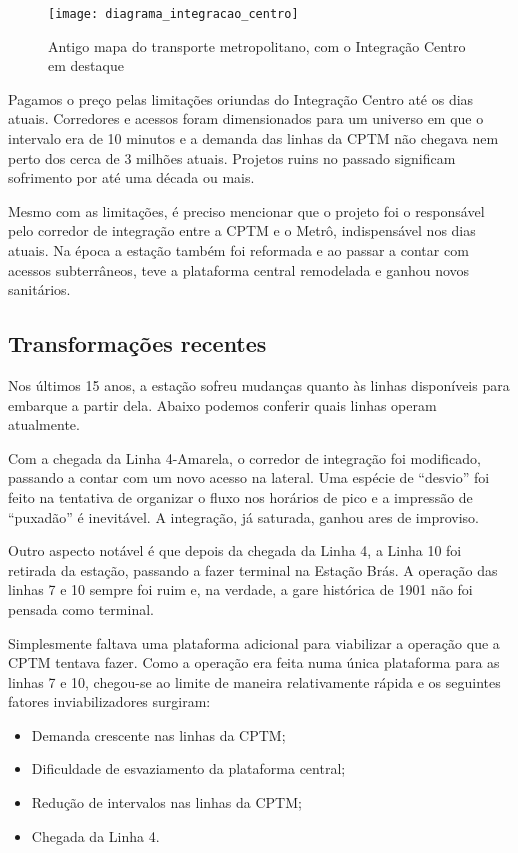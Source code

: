 \documentclass[11pt,fleqn]{book} %
\begin{document}
\begin{figure}[htb]
	\centering
	\texttt{[image: diagrama\_integracao\_centro]}
	\caption[Mapa do Integração Centro]{Antigo mapa do transporte metropolitano, com o Integração Centro em destaque}
	\label{fig:diag_ic}
\end{figure}

Pagamos o preço pelas limitações oriundas do Integração Centro até os dias atuais. Corredores e acessos foram dimensionados para um universo em que o intervalo era de 10 minutos e a demanda das linhas da CPTM não chegava nem perto dos cerca de 3 milhões atuais. Projetos ruins no passado significam sofrimento por até uma década ou mais.

Mesmo com as limitações, é preciso mencionar que o projeto foi o responsável pelo corredor de integração entre a CPTM e o Metrô, indispensável nos dias atuais. Na época a estação também foi reformada e ao passar a contar com acessos subterrâneos, teve a plataforma central remodelada e ganhou novos sanitários.

\subsection{Transformações recentes}

Nos últimos 15 anos, a estação sofreu mudanças quanto às linhas disponíveis para embarque a partir dela. Abaixo podemos conferir quais linhas operam atualmente.


Com a chegada da Linha 4-Amarela, o corredor de integração foi modificado, passando a contar com um novo acesso na lateral. Uma espécie de “desvio” foi feito na tentativa de organizar o fluxo nos horários de pico e a impressão de “puxadão” é inevitável. A integração, já saturada, ganhou ares de improviso.

Outro aspecto notável é que depois da chegada da Linha 4, a Linha 10 foi retirada da estação, passando a fazer terminal na Estação Brás. A operação das linhas 7 e 10 sempre foi ruim e, na verdade, a gare histórica de 1901 não foi pensada como terminal.

Simplesmente faltava uma plataforma adicional para viabilizar a operação que a CPTM tentava fazer. Como a operação era feita numa única plataforma para as linhas 7 e 10, chegou-se ao limite de maneira relativamente rápida e os seguintes fatores inviabilizadores surgiram:

\begin{itemize}
	\item Demanda crescente nas linhas da CPTM;
	\item Dificuldade de esvaziamento da plataforma central;
	\item Redução de intervalos nas linhas da CPTM;
	\item Chegada da Linha 4.
\end{itemize}
\end{document}
